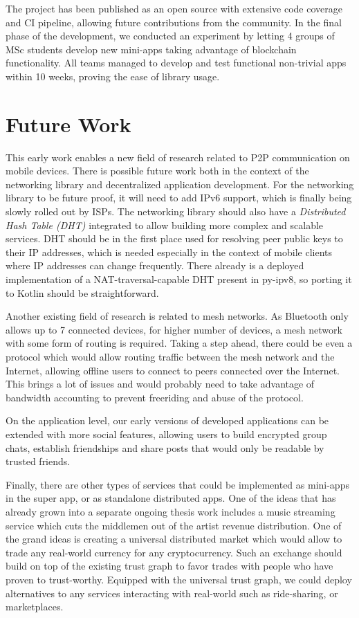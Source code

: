 The project has been published as an open source with extensive code coverage and CI pipeline, allowing future contributions from the community. In the final phase of the development, we conducted an experiment by letting 4 groups of MSc students develop new mini-apps taking advantage of blockchain functionality. All teams managed to develop and test functional non-trivial apps within 10 weeks, proving the ease of library usage.

\section{Future Work}

This early work enables a new field of research related to P2P communication on mobile devices. There is possible future work both in the context of the networking library and decentralized application development. For the networking library to be future proof, it will need to add IPv6 support, which is finally being slowly rolled out by ISPs. The networking library should also have a \textit{Distributed Hash Table (DHT)} integrated to allow building more complex and scalable services. DHT should be in the first place used for resolving peer public keys to their IP addresses, which is needed especially in the context of mobile clients where IP addresses can change frequently. There already is a deployed implementation of a NAT-traversal-capable DHT present in py-ipv8, so porting it to Kotlin should be straightforward.

Another existing field of research is related to mesh networks. As Bluetooth only allows up to 7 connected devices, for higher number of devices, a mesh network with some form of routing is required. Taking a step ahead, there could be even a protocol which would allow routing traffic between the mesh network and the Internet, allowing offline users to connect to peers connected over the Internet. This brings a lot of issues and would probably need to take advantage of bandwidth accounting to prevent freeriding and abuse of the protocol.

On the application level, our early versions of developed applications can be extended with more social features, allowing users to build encrypted group chats, establish friendships and share posts that would only be readable by trusted friends.

Finally, there are other types of services that could be implemented as mini-apps in the super app, or as standalone distributed apps. One of the ideas that has already grown into a separate ongoing thesis work includes a music streaming service which cuts the middlemen out of the  artist revenue distribution. One of the grand ideas is creating a universal distributed market which would allow to trade any real-world currency for any cryptocurrency. Such an exchange should build on top of the existing trust graph to favor trades with people who have proven to trust-worthy. Equipped with the universal trust graph, we could deploy alternatives to any services interacting with real-world such as ride-sharing, or marketplaces.

